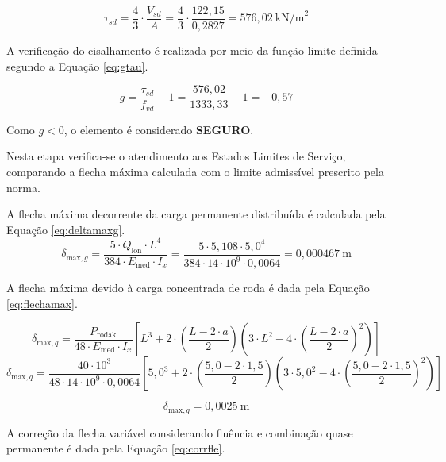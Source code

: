 \begin{equation}
\tau_{sd} = \frac{4}{3} \cdot\frac{V_{sd}}{A}
          = \frac{4}{3} \cdot\frac{122{,}15}{0{,}2827}
          = 576{,}02\ \text{kN/m}^2
\label{eq:tausd}
\end{equation}

A verificação do cisalhamento é realizada por meio da função limite definida segundo a Equação \eqref{eq:gtau}.

\begin{equation}
g = \frac{\tau_{sd}}{f_{vd}} - 1
  = \frac{576{,}02}{1333{,}33} - 1
  = -0{,}57
\label{eq:gtau}
\end{equation}

Como $g < 0$, o elemento é considerado \textbf{SEGURO}.

Nesta etapa verifica-se o atendimento aos Estados Limites de Serviço, comparando a flecha máxima calculada com o limite admissível prescrito pela norma.

A flecha máxima decorrente da carga permanente distribuída é calculada pela Equação \eqref{eq:deltamaxg}.
\begin{equation}
\delta_{\text{max},g} = \frac{5 \cdot Q_{\text{lon}} \cdot L^4}{384 \cdot E_{\text{med}} \cdot I_x}
                      = \frac{5 \cdot 5{,}108\cdot 5{,}0^4}
       {384 \cdot 14 \cdot 10^9 \cdot 0{,}0064}
                      = 0{,}000467\ \text{m}
\label{eq:deltamaxg}
\end{equation}

A flecha máxima devido à carga concentrada de roda é dada pela Equação \eqref{eq:flechamax}.

\begin{equation}
\delta_{\text{max},q}
= \frac{P_{\text{rodak}}}{48 \cdot E_{\text{med}} \cdot I_x}
\left[
L^3 + 2 \cdot \left(\frac{L - 2 \cdot a}{2}\right)
\left(
3 \cdot L^2 - 4 \cdot \left(\frac{L - 2 \cdot a}{2}\right)^2
\right)
\right]
\end{equation}
\begin{equation}
\delta_{\text{max},q}
= \frac{40 \cdot 10^3}{48 \cdot 14 \cdot 10^9 \cdot 0{,}0064}
\left[
5,0^3 + 2 \cdot (\frac{5{,}0 - 2 \cdot 1,5}{2})
\left(
3 \cdot 5{,}0^2 - 4 \cdot (\frac{5{,}0 - 2 \cdot 1,5}{2})^2
\right)
\right]
\end{equation}

\begin{equation}
\delta_{\text{max},q} = 0{,}0025\ \text{m}
\label{eq:flechamax}
\end{equation}

A correção da flecha variável considerando fluência e combinação quase permanente é dada pela Equação \eqref{eq:corrfle}.

